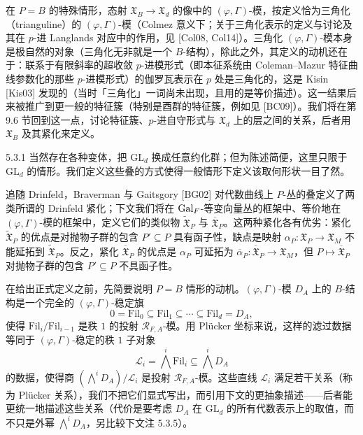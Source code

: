 在 $P=B$ 的特殊情形，态射 $\mathfrak{X}_B\to\mathfrak{X}_d$ 的像中的 $(\varphi,\Gamma)$-模，按定义恰为三角化（trianguline）的 $(\varphi,\Gamma)$-模（Colmez 意义下；关于三角化表示的定义与讨论及其在 $p$-进 Langlands 对应中的作用，见 [Col08, Col14]）。三角化 $(\varphi,\Gamma)$-模本身是极自然的对象（三角化无非就是一个 $B$-结构），除此之外，其定义的动机还在于：联系于有限斜率的超收敛 $p$-进模形式（即本征系统由 Coleman--Mazur 特征曲线参数化的那些 $p$-进模形式）的伽罗瓦表示在 $p$ 处是三角化的，这是 Kisin [Kis03] 发现的（当时「三角化」一词尚未出现，且用的是等价描述）。这一结果后来被推广到更一般的特征簇（特别是酉群的特征簇，例如见 [BC09]）。我们将在第 9.6 节回到这一点，讨论特征簇、$p$-进自守形式与 $\mathfrak{X}_d$ 上的层之间的关系，后者用 $\mathfrak{X}_B$ 及其紧化来定义。

\begin{rem}{5.3.1}
当然存在各种变体，把 $\mathrm{GL}_d$ 换成任意约化群；但为陈述简便，这里只限于 $\mathrm{GL}_d$ 的情形。我们定义这些叠的方式使得一般情形下定义该取何形状一目了然。
\label{thm:a4-5-3-1}
\end{rem}

追随 Drinfeld，Braverman 与 Gaitsgory [BG02] 对代数曲线上 $P$-丛的叠定义了两类所谓的 Drinfeld 紧化；下文我们将在 $\operatorname{Gal}_F$-等变向量丛的框架中、等价地在 $(\varphi,\Gamma)$-模的框架中，定义它们的类似物 $\widetilde{\mathfrak{X}}_P$ 与 $\overline{\mathfrak{X}}_P$。这两种紧化各有优劣：紧化 $\widetilde{\mathfrak{X}}_P$ 的优点是对抛物子群的包含 $P'\subseteq P$ 具有函子性，缺点是映射 $\alpha_P: \mathfrak{X}_P\to\mathfrak{X}_M$ 不能延拓到 $\widetilde{\mathfrak{X}}_P$。反之，紧化 $\overline{\mathfrak{X}}_P$ 的优点是 $\alpha_P$ 可延拓为 $\overline{\alpha}_P: \overline{\mathfrak{X}}_P\to\mathfrak{X}_M$，但 $P\mapsto\overline{\mathfrak{X}}_P$ 对抛物子群的包含 $P'\subseteq P$ 不具函子性。

在给出正式定义之前，先简要说明 $P=B$ 情形的动机。$(\varphi,\Gamma)$-模 $D_A$ 上的 $B$-结构是一个完全的 $(\varphi,\Gamma)$-稳定旗
\[
0=\mathrm{Fil}_0\subseteq\mathrm{Fil}_1\subseteq\cdots\subseteq\mathrm{Fil}_d=D_A,
\]
使得 $\mathrm{Fil}_i/\mathrm{Fil}_{i-1}$ 是秩 $1$ 的投射 $\mathcal{R}_{F,A}$-模。用 Plücker 坐标来说，这样的滤过数据等同于 $(\varphi,\Gamma)$-稳定的秩 $1$ 子对象
\[
\mathcal{L}_i=\bigwedge^i\mathrm{Fil}_i\subseteq\bigwedge^i D_A
\]
的数据，使得商 $(\bigwedge^iD_A)/\mathcal{L}_i$ 是投射 $\mathcal{R}_{F,A}$-模。这些直线 $\mathcal{L}_i$ 满足若干关系（称为 Plücker 关系），我们不把它们显式写出，而引用下文的更抽象描述——后者能更统一地描述这些关系（代价是要考虑 $D_A$ 在 $\mathrm{GL}_d$ 的所有代数表示上的取值，而不只是外幂 $\bigwedge^iD_A$，另比较下文注 5.3.5）。

